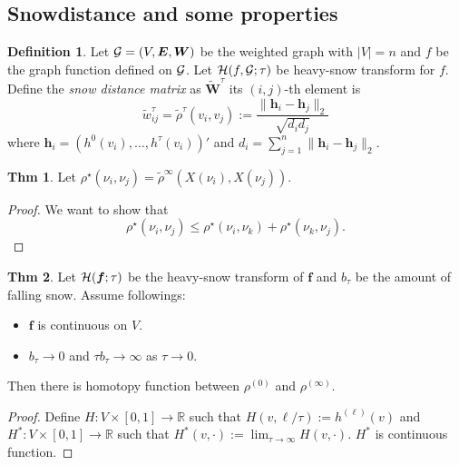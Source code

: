 \documentclass[preprint, review, 12pt]{article}
\theoremstyle{definition}
\newtheorem{dfn}{Definition}
\newtheorem{thm}{Thm}[section]
\theoremstyle{remark}
\begin{document}
\subsection{Snowdistance and some properties} 
\begin{dfn}
Let ${\cal G}=(V,{\boldsymbol E},{\boldsymbol W})$ be the weighted graph with $|V|=n$ and $f$ be the graph function defined on ${\cal G}$. Let ${\cal H}(f,{\cal G};\tau)$ be heavy-snow transform for $f$. Define the \emph{snow distance matrix} as ${\widetilde{\boldsymbol W}}^{\tau}$ its $(i,j)$-th element is 
\[
\tilde w^{\tau}_{ij}=\tilde \rho^{\tau}(v_i , v_j) := \frac{\|{\boldsymbol h}_i- {\boldsymbol h}_j\|_2 }{\sqrt{d_id_j}}
\]
where ${\boldsymbol h}_i=(h^{0}(v_i),\dots,h^{\tau}(v_i))'$ and $d_i=\sum_{j=1}^{n}\|{\boldsymbol h}_i- {\boldsymbol h}_j\|_2$. 
\end{dfn}

\begin{thm} 
Let $\rho^{\star}(\nu_i,\nu_j)=\tilde \rho^{\infty}(X(\nu_i),X(\nu_j)).$ 
\end{thm}
\begin{proof}
We want to show that 
\[
\rho^{\star}(\nu_i,\nu_j)\leq \rho^{\star}(\nu_i,\nu_k)+\rho^{\star}(\nu_k,\nu_j).
\]
\end{proof}

\begin{thm}
Let ${\cal H}({\boldsymbol f};\tau)$ be the heavy-snow transform of ${\boldsymbol f}$ and $b_{\tau}$ be the amount of falling snow. Assume followings:
\begin{itemize}
	\item ${\boldsymbol f}$ is continuous on $V$. 
	\item $b_{\tau} \to 0$ and $\tau b_\tau \to \infty$ as $\tau \to 0$.
\end{itemize}
Then there is homotopy function between $\rho^{(0)}$ and $\rho^{(\infty)}$. 
\end{thm}
\begin{proof}
Define $H:V \times [0,1] \to \mathbb{R}$ such that $H(v,\ell/\tau):=h^{(\ell)}(v)$ and $H^*:V \times [0,1] \to \mathbb{R}$ such that $H^*(v,\cdot):=\lim_{\tau \to \infty} H(v,\cdot)$. $H^*$ is continuous function. 
\end{proof}
\end{document}
